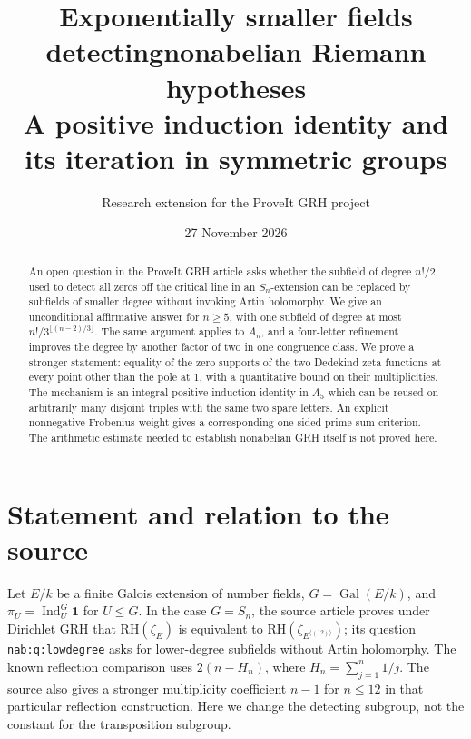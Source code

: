 \documentclass[11pt]{article}
\title{\bfseries Exponentially smaller fields detecting\newline nonabelian Riemann hypotheses\\[6pt]\large A positive induction identity and its iteration in symmetric groups}
\author{Research extension for the ProveIt GRH project}
\date{27 November 2026}
\theoremstyle{remark}\newtheorem{remark}[theorem]{Remark}
\newcommand{\Ind}{\operatorname{Ind}}
\newcommand{\RH}{\mathrm{RH}}
\newcommand{\Gal}{\operatorname{Gal}}
\newcommand{\one}{\mathbf{1}}
\newcommand{\source}{\texttt{nab:q:lowdegree}}
\begin{document}
\maketitle
\begin{abstract}
An open question in the ProveIt GRH article asks whether the subfield of degree
$n!/2$ used to detect all zeros off the critical line in an $S_n$-extension can be
replaced by subfields of smaller degree without invoking Artin holomorphy. We give
an unconditional affirmative answer for $n\ge5$, with one subfield of degree at
most $n!/3^{\lfloor(n-2)/3\rfloor}$. The same argument applies to $A_n$, and a
four-letter refinement improves the degree by another factor of two in one
congruence class. We prove a stronger statement: equality of the zero supports of
the two Dedekind zeta functions at every point other than the pole at $1$, with a
quantitative bound on their multiplicities. The mechanism is an integral positive
induction identity in $A_5$ which can be reused on arbitrarily many disjoint triples
with the same two spare letters. An explicit nonnegative Frobenius weight gives
a corresponding one-sided prime-sum criterion. The arithmetic estimate needed to
establish nonabelian GRH itself is not proved here.
\end{abstract}

\section{Statement and relation to the source}
Let $E/k$ be a finite Galois extension of number fields, $G=\Gal(E/k)$, and
$\pi_U=\Ind_U^G\one$ for $U\le G$. In the case $G=S_n$, the source article
\cite{proveit} proves under Dirichlet GRH that $\RH(\zeta_E)$ is equivalent to
$\RH(\zeta_{E^{\langle(12)\rangle}})$; its question \source{} asks for lower-degree
subfields without Artin holomorphy. The known reflection comparison uses
$2(n-H_n)$, where $H_n=\sum_{j=1}^n1/j$. The source also gives a stronger
multiplicity coefficient $n-1$ for $n\le12$ in that particular reflection
construction. Here we change the detecting subgroup, not the constant for the
transposition subgroup.
\end{document}
